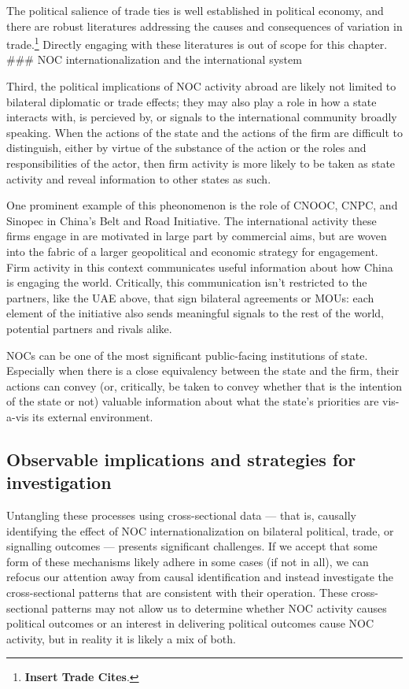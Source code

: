\documentclass[11pt,]{book}
\begin{document}
The political salience of trade ties is well established in political economy, and there are robust literatures addressing the causes and consequences of variation in trade.\footnote{\textbf{Insert Trade Cites}.} Directly engaging with these literatures is out of scope for this chapter.
\#\#\# NOC internationalization and the international system

Third, the political implications of NOC activity abroad are likely not limited to bilateral diplomatic or trade effects; they may also play a role in how a state interacts with, is percieved by, or signals to the international community broadly speaking. When the actions of the state and the actions of the firm are difficult to distinguish, either by virtue of the substance of the action or the roles and responsibilities of the actor, then firm activity is more likely to be taken as state activity and reveal information to other states as such.

One prominent example of this pheonomenon is the role of CNOOC, CNPC, and Sinopec in China's Belt and Road Initiative. The international activity these firms engage in are motivated in large part by commercial aims, but are woven into the fabric of a larger geopolitical and economic strategy for engagement. Firm activity in this context communicates useful information about how China is engaging the world. Critically, this communication isn't restricted to the partners, like the UAE above, that sign bilateral agreements or MOUs: each element of the initiative also sends meaningful signals to the rest of the world, potential partners and rivals alike.

NOCs can be one of the most significant public-facing institutions of state. Especially when there is a close equivalency between the state and the firm, their actions can convey (or, critically, be taken to convey whether that is the intention of the state or not) valuable information about what the state's priorities are vis-a-vis its external environment.

\hypertarget{observable-implications-and-strategies-for-investigation}{%
\subsection{Observable implications and strategies for investigation}\label{observable-implications-and-strategies-for-investigation}}

Untangling these processes using cross-sectional data --- that is, causally identifying the effect of NOC internationalization on bilateral political, trade, or signalling outcomes --- presents significant challenges. If we accept that some form of these mechanisms likely adhere in some cases (if not in all), we can refocus our attention away from causal identification and instead investigate the cross-sectional patterns that are consistent with their operation. These cross-sectional patterns may not allow us to determine whether NOC activity causes political outcomes or an interest in delivering political outcomes cause NOC activity, but in reality it is likely a mix of both.
\end{document}
